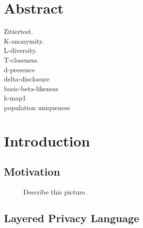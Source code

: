 \documentclass[12pt, a4paper,oneside]{report}
\begin{document}


\setcounter{tocdepth}{10}
\tableofcontents






\listoffigures
\listoftables

\titleformat{\chapter}{\LARGE\bfseries}{\thechapter}{1em}{}




\chapter*{Abstract}

Zitiertest\cite{Gerl2018}.\\
K-anonymity\cite{SWEENEY2002}.\\
L-diversity\cite{Machanavajjhala2006}.\\
T-closeness\cite{Li2007}.\\
d-presence\cite{Nergiz2007}\\
delta-disclosure\cite{Brickell2008}\\
basic-beta-likeness\cite{Cao2012}\\
k-map1\cite{Emam2008}\\
population uniqueness\cite{Dankar2012}\\

\newpage
\chapter{Introduction}

\section{Motivation}

\begin{figure}[!ht]
	\centering
	\caption{Describe this picture.}
	\label{fig:1}
\end{figure}

\section{Layered Privacy Language}
\end{document}
